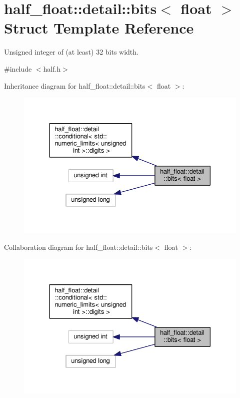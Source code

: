 \hypertarget{structhalf__float_1_1detail_1_1bits_3_01float_01_4}{}\section{half\+\_\+float\+:\+:detail\+:\+:bits$<$ float $>$ Struct Template Reference}
\label{structhalf__float_1_1detail_1_1bits_3_01float_01_4}


Unsigned integer of (at least) 32 bits width.  




{\ttfamily \#include $<$half.\+h$>$}



Inheritance diagram for half\+\_\+float\+:\+:detail\+:\+:bits$<$ float $>$\+:
\nopagebreak
\begin{figure}[H]
\begin{center}
\leavevmode
\includegraphics[width=330pt]{structhalf__float_1_1detail_1_1bits_3_01float_01_4__inherit__graph}
\end{center}
\end{figure}


Collaboration diagram for half\+\_\+float\+:\+:detail\+:\+:bits$<$ float $>$\+:
\nopagebreak
\begin{figure}[H]
\begin{center}
\leavevmode
\includegraphics[width=330pt]{structhalf__float_1_1detail_1_1bits_3_01float_01_4__coll__graph}
\end{center}
\end{figure}
